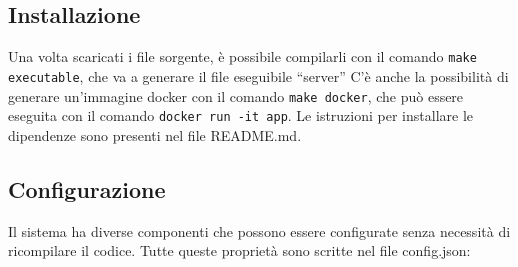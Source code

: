 \documentclass[conference]{IEEEtran}
\begin{document}
\subsection{Installazione}
Una volta scaricati i file sorgente, è possibile compilarli con il comando \verb!make executable!, che va a generare il
file eseguibile ``server'' C'è anche la possibilità di generare un'immagine docker con il comando \verb!make docker!, che
può essere eseguita con il comando \verb!docker run -it app!. Le istruzioni per installare le dipendenze sono presenti nel
file README.md.

\subsection{Configurazione}
Il sistema ha diverse componenti che possono essere configurate senza necessità di ricompilare il codice. Tutte queste
proprietà sono scritte nel file config.json:
\end{document}
